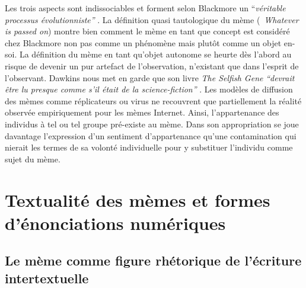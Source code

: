 Les trois aspects sont indissociables et forment selon Blackmore un {\textquotedblleft}\textit{véritable processus évolutionniste{\textquotedblright} }\citep{Blackmore2006}. La définition quasi tautologique du mème ({\guillemotleft}~\textit{Whatever is passed on{\guillemotright}}) montre bien comment le mème en tant que concept est considéré chez Blackmore non pas comme un phénomène mais plutôt comme un objet en-soi. La définition du mème en tant qu{\textquoteright}objet autonome se heurte dès l{\textquoteright}abord au risque de devenir un pur artefact de l{\textquoteright}observation, n{\textquoteright}existant que dans l{\textquoteright}esprit de l{\textquoteright}observant. Dawkins nous met en garde que son livre \textit{The Selfish Gene} \textit{{\textquotedblleft}devrait être lu presque comme s{\textquoteright}il était de la science-fiction{\textquotedblright} }\citep{Dawkins1989}. Les modèles de diffusion des mèmes comme réplicateurs ou virus ne recouvrent que partiellement la réalité observée empiriquement pour les mèmes Internet. Ainsi, l{\textquoteright}appartenance des individus à tel ou tel groupe pré-existe au mème. Dans son appropriation se joue davantage l{\textquoteright}expression d{\textquoteright}un sentiment d{\textquoteright}appartenance qu{\textquoteright}une contamination qui nierait les termes de sa volonté individuelle pour y substituer l{\textquoteright}individu comme sujet du mème.  


\section[Textualité des mèmes et formes d{\textquoteright}énonciations numériques]{Textualité des mèmes et formes d{\textquoteright}énonciations numériques}

\subsection[Le mème comme figure rhétorique de l{\textquoteright}écriture intertextuelle]{Le mème comme figure rhétorique de l{\textquoteright}écriture intertextuelle}

